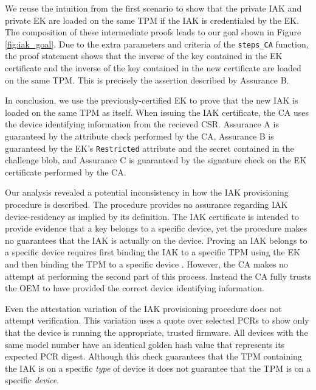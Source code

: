 \documentclass[runningheads]{llncs}
\begin{document}
We reuse the intuition from the first scenario to show that the private
IAK and private EK are loaded on the same TPM if the IAK is
credentialed by the EK.
The composition of these intermediate proofs leads
to our goal shown in Figure \ref{fig:iak_goal}.  Due to the extra
parameters and criteria of the \verb|steps_CA| function, the proof
statement shows that the inverse of the key contained in the EK
certificate and the inverse of the key contained in the new
certificate are loaded on the same TPM. This is precisely the
assertion described by Assurance B.

In conclusion, we use the previously-certified EK to prove that the new
IAK is loaded on the same TPM as itself. When issuing the IAK
certificate, the CA uses the device identifying information from the
recieved CSR.  Assurance A is guaranteed by the attribute check
performed by the CA, Assurance B is guaranteed by the EK's
\verb|Restricted| attribute and the secret contained in the challenge
blob, and Assurance C is guaranteed by the signature check on the EK
certificate performed by the CA.

Our analysis revealed a potential inconsistency in how the IAK
provisioning procedure is described. The procedure provides no
assurance regarding IAK device-residency as implied by its definition.
The IAK certificate is intended to provide evidence that a key belongs
to a specific device, yet the procedure makes no guarantees that the
IAK is actually on the device.  Proving an IAK belongs to a specific
device requires first binding the IAK to a specific TPM using the EK
and then binding the TPM to a specific device \citep{DevIDSpec-TCG}.
However, the CA makes no attempt at performing the second part of this
process. Instead the CA fully trusts the OEM to have provided the
correct device identifying information.

Even the attestation variation of the IAK provisioning procedure does
not attempt verification. This variation uses a quote over selected
PCRs to show only that the device is running the appropriate, trusted
firmware. All devices with the same model number have an identical
golden hash value that represents its expected PCR digest.  Although
this check guarantees that the TPM containing the IAK is on a specific
\textit{type} of device it does not guarantee that the TPM is on a
specific \emph{device}.
\end{document}
